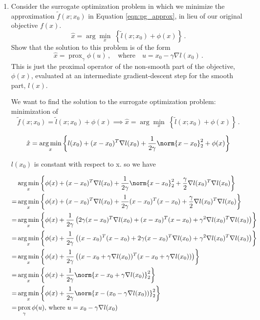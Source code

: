 \documentclass{article}
\DeclareMathOperator*{\argmin}{arg\,min}
\DeclareMathOperator*{\prox}{prox}
\begin{document}
\begin{enumerate}[label=(\Alph*)]
\item Consider the surrogate optimization problem in which we minimize the approximation $\tilde{f}(x; x_0)$ in Equation \ref{eqn:pg_approx}, in lieu of our original objective $f(x)$. 
$$
\hat{x} = \arg \min_x \; \left\{   \tilde{l}(x; x_0) + \phi(x)  \right\} \, .
$$
Show that the solution to this problem is of the form
\begin{equation}
\label{eqn:pg_xhat}
\hat{x} = \prox_{\gamma} \phi(u) \, , \quad \mbox{where} \quad u = x_0 - \gamma \nabla l(x_0) \, .
\end{equation}
This is just the proximal operator of the non-smooth part of the objective, $\phi(x)$, evaluated at an intermediate gradient-descent step for the smooth part, $l(x)$.

\bigskip
{\color{blue}
We want to find the solution to the surrogate optimization problem:  minimization of \\ $$\tilde{f}(x;x_0) = \tilde{l}(x;x_0) + \phi(x) \implies \hat{x} = \arg \min_x \; \left\{   \tilde{l}(x; x_0) + \phi(x)  \right\} \, .$$

$$
\hat{x} = \argmin_x \left \{ l(x_0) + (x - x_0)^{T} \nabla l(x_0) + \frac{1}{2\gamma}\norm{x - x_0}^2_2 + \phi(x) \right \}
$$

$l(x_0)$ is constant with respect to x. so we have

\begin{align}
&\argmin_x \left \{ \phi(x) + (x - x_0)^{T} \nabla l(x_0) + \frac{1}{2\gamma}\norm{x - x_0}^2_2 + \frac{\gamma}{2}\nabla l(x_0)^T\nabla l(x_0) \right \} \\
=&\argmin_x \left \{ \phi(x) + (x - x_0)^{T} \nabla l(x_0) + \frac{1}{2\gamma}(x - x_0)^{T}(x - x_0) + \frac{\gamma}{2}\nabla l(x_0)^T \nabla l(x_0)\right \} \\
=& \argmin_x \left \{ \phi(x) + \frac{1}{2\gamma} \left( 2\gamma (x - x_0)^{T} \nabla l(x_0) + (x - x_0)^{T}(x - x_0) + \gamma^2 \nabla l(x_0)^T \nabla l(x_0)\right) \right \} \\
=& \argmin_x \left \{ \phi(x) + \frac{1}{2\gamma} \left(  (x - x_0)^{T}(x - x_0) + 2\gamma (x - x_0)^{T} \nabla l(x_0) + \gamma^2 \nabla l(x_0)^T \nabla l(x_0)\right) \right \} \\
=& \argmin_x \left \{ \phi(x) + \frac{1}{2\gamma} \left(  (x - x_0 + \gamma \nabla l(x_0))^{T}(x - x_0 + \gamma \nabla l(x_0))\right) \right \} \\
=& \argmin_x \left \{ \phi(x) + \frac{1}{2\gamma}  \norm{x - x_0 + \gamma \nabla l(x_0)}_2^2  \right \} \\
=& \argmin_x \left \{ \phi(x) + \frac{1}{2\gamma}  \norm{x - (x_0 - \gamma \nabla l(x_0))}_2^2  \right \}\\
=& \prox_\gamma \phi(u)  \text{,  where } u = x_{0} - \gamma \nabla l (x_0)
\end{align}

}
\end{enumerate}
\end{document}

